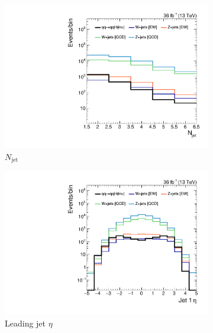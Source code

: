 \begin{figure}[]
\begin{center}
\begin{subfigure}[t]{0.32\textwidth}
            \includegraphics[width=\textwidth]{figures/vbf/shapes/loosesignal_nJot_logy.pdf}
            \caption{$N_\mathrm{jet}$}
        \end{subfigure}
        \begin{subfigure}[t]{0.32\textwidth}
            \includegraphics[width=\textwidth]{figures/vbf/shapes/loosesignal_jotEta_0__logy.pdf}
            \caption{Leading jet $\eta$}
        \end{subfigure}
        \begin{subfigure}[t]{0.32\textwidth}

\end{subfigure}
\end{center}
\end{figure}
